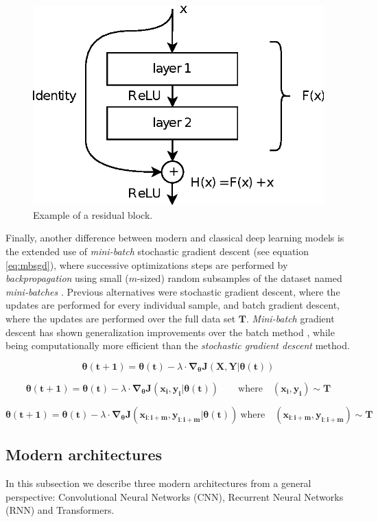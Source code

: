 \begin{figure}
	\centering
	\includegraphics[width=0.5\linewidth]{chapter2/images/residual}
	\caption{Example of a residual block.}
	\label{fig:residual}
\end{figure}


Finally, another difference between modern and classical deep learning models is the extended use of \textit{mini-batch} stochastic gradient descent (see equation \ref{eq:mbsgd}), where successive optimizations steps are performed by \textit{backpropagation} using small ($m$-sized) random subsamples of the dataset named \textit{mini-batches} \autocite{ruder2016}. Previous alternatives were stochastic gradient descent, where the updates are performed for every individual sample, and batch gradient descent, where the updates are performed over the full data set $\mathbf{T}$. \textit{Mini-batch} gradient descent has shown generalization improvements over the batch method \autocite{Hoffer2017}, while being computationally more efficient than the \textit{stochastic gradient descent} method.


\begin{equation}
	\label{eq:bgd}
	\mathbf{\theta(t+1)} = \mathbf{\theta(t)} - \lambda \cdot \mathbf{\nabla_\theta J(X, Y|\theta(t))}
\end{equation}

\begin{equation}
	\label{eq:sgd}
	\mathbf{\theta(t+1)} = \mathbf{\theta(t)} - \lambda \cdot \mathbf{\nabla_\theta J(x_i, y_i|\theta(t))} \quad \mathrm \quad \mathrm{where} \quad (\mathbf{x_i}, \mathbf{y_i}) \sim \mathbf{T}
\end{equation}

\begin{equation}
	\label{eq:mbsgd}
	\mathbf{\theta(t+1)} = \mathbf{\theta(t)} - \lambda \cdot \mathbf{\nabla_\theta J(x_{i:i+m}, y_{i:i+m}|\theta(t))} \  \mathrm{where} \quad  (\mathbf{x_{i:i+m}}, \mathbf{y_{i:i+m}}) \sim \mathbf{T}
\end{equation}


\subsection{Modern architectures}
In this subsection we describe three modern architectures from a general perspective: Convolutional Neural Networks (CNN), Recurrent Neural Networks (RNN) and Transformers.

